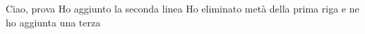 Ciao, prova 
Ho aggiunto la seconda linea
Ho eliminato metà della prima riga e ne ho aggiunta una terza
